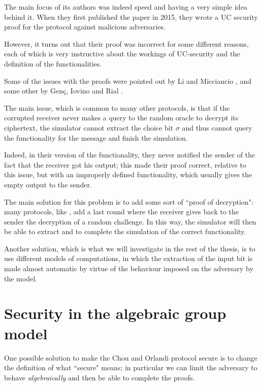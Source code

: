The main focus of its authors was indeed speed and having a very simple idea behind it. When they first published the paper in 2015, they wrote a UC security proof for the protocol against malicious adversaries.

However, it turns out that their proof was incorrect for some different reasons, each of which is very instructive about the workings of UC-security and the definition of the functionalities.

Some of the issues with the proofs were pointed out by Li and Micciancio \cite{CO_Li_Micciancio}, and some other by Genç, Iovino and Rial \cite{CO_GIR}.

The main issue, which is common to many other protocols, is that if the corrupted receiver never makes a query to the random oracle to decrypt its ciphertext, the simulator cannot extract the choice bit $\sigma$ and thus cannot query the functionality for the message and finish the simulation.

Indeed, in their version of the functionality, they never notified the sender of the fact that the receiver got his output; this made their proof correct, relative to this issue, but with an improperly defined functionality, which usually gives the empty output to the sender.


The main solution for this problem is to add some sort of ``proof of decryption": many protocols, like \cite{BDD}, add a last round where the receiver gives back to the sender the decryption of a random challenge. In this way, the simulator will then be able to extract and to complete the simulation of the correct functionality.

Another solution, which is what we will investigate in the rest of the thesis, is to use different models of computations, in which the extraction of the input bit is made almost automatic by virtue of the behaviour imposed on the adversary by the model.

\section{Security in the algebraic group model}
One possible solution to make the Chou and Orlandi protocol secure is to change the definition of what ``secure" means; in particular we can limit the adversary to behave \emph{algebraically} and then be able to complete the proofs.


